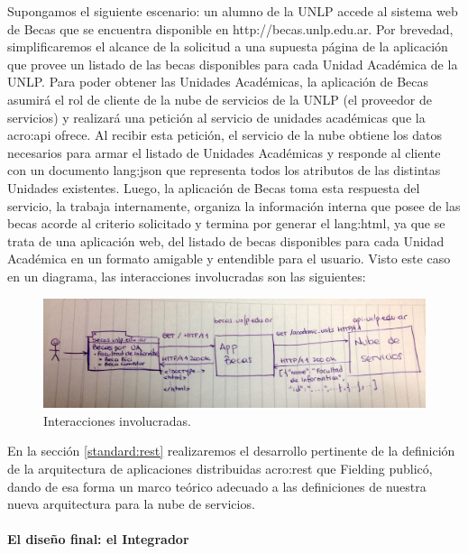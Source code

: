 Supongamos el siguiente escenario: un alumno de la UNLP accede al sistema web de Becas que se encuentra disponible en http://becas.unlp.edu.ar. Por brevedad, simplificaremos el alcance de la solicitud a una supuesta página de la aplicación que provee un listado de las becas disponibles para cada Unidad Académica de la UNLP. Para poder obtener las Unidades Académicas, la aplicación de Becas asumirá el rol de cliente de la nube de servicios de la UNLP (el proveedor de servicios) y realizará una petición al servicio de unidades académicas que la \gls{acro:api} ofrece. Al recibir esta petición, el servicio de la nube obtiene los datos necesarios para armar el listado de Unidades Académicas y responde al cliente con un documento \gls{lang:json} que representa todos los atributos de las distintas Unidades existentes. Luego, la aplicación de Becas toma esta respuesta del servicio, la trabaja internamente, organiza la información interna que posee de las becas acorde al criterio solicitado y termina por generar el \gls{lang:html}, ya que se trata de una aplicación web, del listado de becas disponibles para cada Unidad Académica en un formato amigable y entendible para el usuario. Visto este caso en un diagrama, las interacciones involucradas son las siguientes:

\begin{figure}
  \includegraphics[width=\linewidth]{src/images/01-capitulo-1/ejemplo-rest-becas.jpg}
  \caption{Interacciones involucradas.}
  \label{fig:ejemplo-rest-becas}
\end{figure}

En la sección \ref{standard:rest} realizaremos el desarrollo pertinente de la definición de la arquitectura de aplicaciones distribuidas \gls{acro:rest} que Fielding publicó, dando de esa forma un marco teórico adecuado a las definiciones de nuestra nueva arquitectura para la nube de servicios.


\paragraph{El diseño final: el Integrador}

